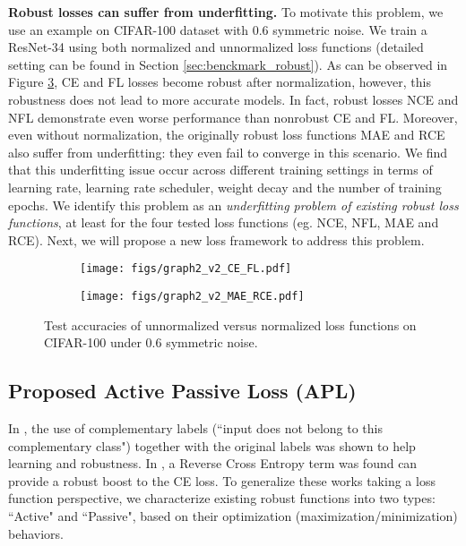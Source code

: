 \documentclass{article}
\begin{document}
\noindent\textbf{Robust losses can suffer from underfitting.}
To motivate this problem, we use an example on CIFAR-100 dataset with 0.6 symmetric noise. We train a ResNet-34 \cite{he2016deep} using both normalized and unnormalized loss functions (detailed setting can be found in Section \ref{sec:benckmark_robust}). As can be observed in Figure \ref{fig:1}, CE and FL losses become robust after normalization, however, this robustness does not lead to more accurate models. In fact, robust losses NCE and NFL demonstrate even worse performance than nonrobust CE and FL. Moreover, even without normalization, the originally robust loss functions MAE and RCE also suffer from underfitting: they even fail to converge in this scenario.
We find that this underfitting issue occur across different training settings in terms of learning rate, learning rate scheduler, weight decay and the number of training epochs.
We identify this problem as an \emph{underfitting problem of existing robust loss functions}, at least for the four tested loss functions (eg. NCE, NFL, MAE and RCE).
Next, we will propose a new loss framework to address this problem.

\begin{figure}[!ht]
	\centering
	\begin{subfigure}{0.48\linewidth}
		\texttt{[image: figs/graph2\_v2\_CE\_FL.pdf]}
		\label{ce_nce_100}
	\end{subfigure}
	\begin{subfigure}{0.48\linewidth} 
		\texttt{[image: figs/graph2\_v2\_MAE\_RCE.pdf]}
		\label{fl_nfl_100}
	\end{subfigure}
	\vspace{-0.15 in}
	\caption{Test accuracies of unnormalized versus normalized loss functions on CIFAR-100 under 0.6 symmetric noise.}
	\vspace{-0.15 in}
	\label{fig:1}
\end{figure}


\subsection{Proposed Active Passive Loss (APL)}\label{sec:pos_neg}
In \cite{kim2019nlnl}, the use of complementary labels (``input does not belong to this complementary class") together with the original labels was shown to help learning and robustness.
In \cite{wang2019symmetric}, a Reverse Cross Entropy term was found can provide a robust boost to the CE loss. To generalize these works taking a loss function perspective, we characterize existing robust functions into two types: ``Active" and ``Passive", based on their optimization (maximization/minimization) behaviors.
\end{document}
